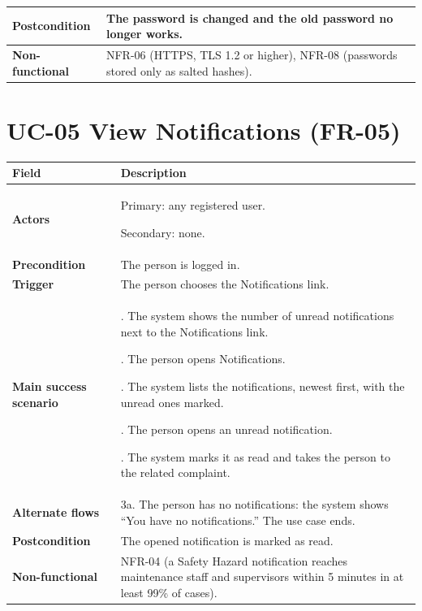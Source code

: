 \documentclass[11pt,a4paper]{report}
\begin{document}
\begin{longtable}{|>{\raggedright\arraybackslash}p{3.0cm}|>{\raggedright\arraybackslash}p{12.4cm}|}
\textbf{Postcondition} & The password is changed and the old password no longer works. \\ \hline
\textbf{Non-functional} & NFR-06 (HTTPS, TLS 1.2 or higher), NFR-08 (passwords stored only as salted hashes). \\ \hline
\end{longtable}
\section{UC-05 View Notifications (FR-05)}
\begin{longtable}{|>{\raggedright\arraybackslash}p{3.0cm}|>{\raggedright\arraybackslash}p{12.4cm}|}
\hline \textbf{Field} & \textbf{Description} \\ \hline \endhead
\textbf{Actors} & Primary: any registered user.\par\smallskip Secondary: none. \\ \hline
\textbf{Precondition} & The person is logged in. \\ \hline
\textbf{Trigger} & The person chooses the Notifications link. \\ \hline
\textbf{Main success scenario} & 1. The system shows the number of unread notifications next to the Notifications link.\par\smallskip 2. The person opens Notifications.\par\smallskip 3. The system lists the notifications, newest first, with the unread ones marked.\par\smallskip 4. The person opens an unread notification.\par\smallskip 5. The system marks it as read and takes the person to the related complaint. \\ \hline
\textbf{Alternate flows} & 3a. The person has no notifications: the system shows ``You have no notifications.'' The use case ends. \\ \hline
\textbf{Postcondition} & The opened notification is marked as read. \\ \hline
\textbf{Non-functional} & NFR-04 (a Safety Hazard notification reaches maintenance staff and supervisors within 5 minutes in at least 99\% of cases). \\ \hline
\end{longtable}
\end{document}

